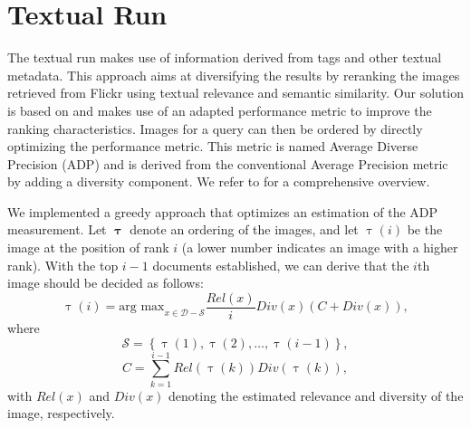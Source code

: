 \documentclass{acm_proc_article-me11_tweaked}
\begin{document}
\section{Textual Run}
The textual run makes use of information derived from tags and other textual metadata.
This approach aims at diversifying the results by reranking the images retrieved from Flickr using textual relevance and semantic similarity.
Our solution is based on \cite{textual-diversification} and makes use of an adapted performance metric to improve the ranking characteristics.
Images for a query can then be ordered by directly optimizing the performance metric.
This metric is named Average Diverse Precision (ADP) and is derived from the conventional Average Precision metric by adding a diversity component.
We refer to \cite{textual-diversification} for a comprehensive overview.

We implemented a greedy approach that optimizes an estimation of the ADP measurement. 
Let $\pmb\uptau$ denote an ordering of the images, and let $\uptau(i)$ be the image at the position of rank $i$ (a lower number indicates an image with a higher rank).
With the top $ i - 1 $ documents established, we can derive that the $i$th image should be decided as follows:
\begin{equation}
 \displaystyle
  \uptau(i) = \text{arg max}_{x \in \mathscr{D} - \mathscr{S} } \frac{Rel(x)}{i} Div(x) ( C + Div(x) ),
\end{equation}
where
\begin{equation}
\mathscr{S} = \left\{\uptau(1), \uptau(2), \ldots , \uptau(i - 1)\right\} ,
\end{equation}
\begin{equation}
C = \sum^{i-1}_{k=1} Rel(\uptau(k)) Div(\uptau(k)),
\end{equation}
with $Rel(x)$ and $Div(x)$ denoting the estimated relevance and diversity of the image, respectively.

%
\end{document}

